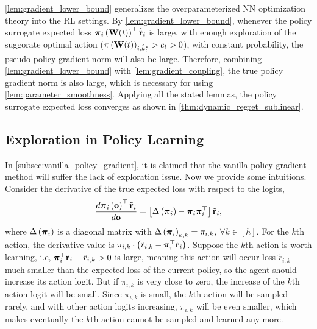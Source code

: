 \cref{lem:gradient_lower_bound} generalizes the overparameterized NN optimization theory into the RL settings. By \cref{lem:gradient_lower_bound}, whenever the policy surrogate expected loss ${\boldsymbol{\pi}}_i\left( {\mathbf{W}}(t) \right)^\top \hat{{\tilde{\mathbf{r}}}}_{i}$ is large, with enough exploration of the suggorate optimal action ($\pi\left({\mathbf{W}}(t)\right)_{i, \hat{k}_i^*} > c_t > 0$), with constant probability, the pseudo policy gradient norm will also be large. Therefore, combining \cref{lem:gradient_lower_bound} with \cref{lem:gradient_coupling}, the true policy gradient norm is also large, which is necessary for using \cref{lem:parameter_smoothness}. Applying all the stated lemmas, the policy surrogate expected loss converges as shown in \cref{thm:dynamic_regret_sublinear}.

\subsection{Exploration in Policy Learning}
\label{subsec:exploration_in_policy_learning}

In \cref{subsec:vanilla_policy_gradient}, it is claimed that the vanilla policy gradient method will suffer the lack of exploration issue. Now we provide some intuitions. Consider the derivative of the true expected loss with respect to the logits,
\begin{equation}
\label{eq:logit_derivative}
\begin{split}
    \frac{d {\boldsymbol{\pi}}_i\left( {\mathbf{o}} \right)^\top {\tilde{\mathbf{r}}}_i}{d {\mathbf{o}}} = \left[ \Delta\left( {\boldsymbol{\pi}}_i \right) - {\boldsymbol{\pi}}_i {\boldsymbol{\pi}}_i^\top \right] {\tilde{\mathbf{r}}}_i,
\end{split}
\end{equation}
where $\Delta\left( {\boldsymbol{\pi}}_i \right)$ is a diagonal matrix with $\Delta\left( {\boldsymbol{\pi}}_i \right)_{k,k} = \pi_{i,k}$, $\forall k \in [h]$. For the $k$th action, the derivative value is $\pi_{i,k} \cdot \left( \tilde{r}_{i,k} - {\boldsymbol{\pi}}_i^\top {\tilde{\mathbf{r}}}_i \right)$. Suppose the $k$th action is worth learning, i.e, ${\boldsymbol{\pi}}_i^\top {\tilde{\mathbf{r}}}_i - \tilde{r}_{i,k} > 0$ is large, meaning this action will occur loss $\tilde{r}_{i,k}$ much smaller than the expected loss of the current policy, so the agent should increase its action logit. But if $\pi_{i,k}$ is very close to zero, the increase of the $k$th action logit will be small. Since $\pi_{i,k}$ is small, the $k$th action will be sampled rarely, and with other action logits increasing, $\pi_{i,k}$ will be even smaller, which makes eventually the $k$th action cannot be sampled and learned any more.

